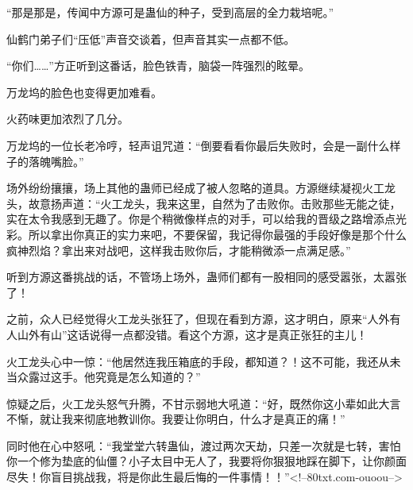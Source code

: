 \begin{this_body}
“那是那是，传闻中方源可是蛊仙的种子，受到高层的全力栽培呢。”

仙鹤门弟子们“压低”声音交谈着，但声音其实一点都不低。

“你们……”方正听到这番话，脸色铁青，脑袋一阵强烈的眩晕。

万龙坞的脸色也变得更加难看。

火药味更加浓烈了几分。

万龙坞的一位长老冷哼，轻声诅咒道：“倒要看看你最后失败时，会是一副什么样子的落魄嘴脸。”

场外纷纷攘攘，场上其他的蛊师已经成了被人忽略的道具。方源继续凝视火工龙头，故意扬声道：“火工龙头，我来这里，自然为了击败你。击败那些无能之徒，实在太令我感到无趣了。你是个稍微像样点的对手，可以给我的晋级之路增添点光彩。所以拿出你真正的实力来吧，不要保留，我记得你最强的手段好像是那个什么疯神烈焰？拿出来对战吧，这样我击败你后，才能稍微添一点满足感。”

听到方源这番挑战的话，不管场上场外，蛊师们都有一股相同的感受嚣张，太嚣张了！

之前，众人已经觉得火工龙头张狂了，但现在看到方源，这才明白，原来“人外有人山外有山”这话说得一点都没错。看这个方源，这才是真正张狂的主儿！

火工龙头心中一惊：“他居然连我压箱底的手段，都知道？！这不可能，我还从未当众露过这手。他究竟是怎么知道的？”

惊疑之后，火工龙头怒气升腾，不甘示弱地大吼道：“好，既然你这小辈如此大言不惭，就让我来彻底地教训你。我要让你明白，什么才是真正的痛！”

同时他在心中怒吼：“我堂堂六转蛊仙，渡过两次天劫，只差一次就是七转，害怕你一个修为垫底的仙僵？小子太目中无人了，我要将你狠狠地踩在脚下，让你颜面尽失！你盲目挑战我，将是你此生最后悔的一件事情！！”<!--80txt.com-ouoou-->

\end{this_body}

